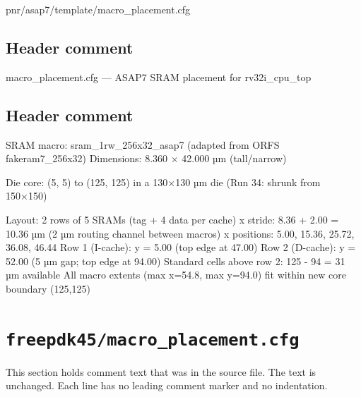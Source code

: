 \begin{relocated}{pnr/asap7/template/macro_placement.cfg}

\subsection*{Header comment}

\begin{textblock}
macro_placement.cfg — ASAP7 SRAM placement for rv32i_cpu_top
\end{textblock}

\subsection*{Header comment}

\begin{textblock}
SRAM macro: sram_1rw_256x32_asap7 (adapted from ORFS fakeram7_256x32)
  Dimensions: 8.360 × 42.000 µm (tall/narrow)

Die core: (5, 5) to (125, 125) in a 130×130 µm die (Run 34: shrunk from 150×150)

Layout: 2 rows of 5 SRAMs (tag + 4 data per cache)
  x stride: 8.36 + 2.00 = 10.36 µm (2 µm routing channel between macros)
  x positions: 5.00, 15.36, 25.72, 36.08, 46.44
  Row 1 (I-cache): y = 5.00 (top edge at 47.00)
  Row 2 (D-cache): y = 52.00 (5 µm gap; top edge at 94.00)
  Standard cells above row 2: 125 - 94 = 31 µm available
  All macro extents (max x=54.8, max y=94.0) fit within new core boundary (125,125)
\end{textblock}

\end{relocated}

\section{\texttt{freepdk45/macro\_placement.cfg}}\label{tm:pd:freepdk45-macro-placement-cfg}

This section holds comment text that was in the source file. The text is unchanged. Each line has no leading comment marker and no indentation.

